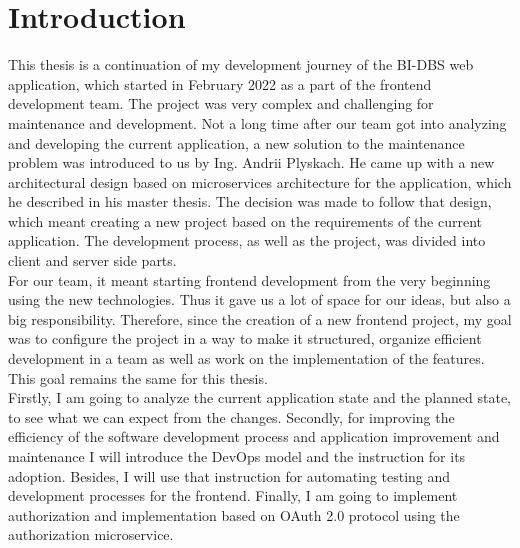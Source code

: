 \chapter{Introduction}

This thesis is a continuation of my development journey of the BI-DBS web application, which started in February 2022 as a part of the frontend development team. The project was very complex and challenging for maintenance and development. Not a long time after our team got into analyzing and developing the current application, a new solution to the maintenance problem was introduced to us by Ing. Andrii Plyskach. He came up with a new architectural design based on microservices architecture for the application, which he described in his master thesis\cite{mt-plyskach}. The decision was made to follow that design, which meant creating a new project based on the requirements of the current application. The development process, as well as the project, was divided into client and server side parts.\\
For our team, it meant starting frontend development from the very beginning using the new technologies. Thus it gave us a lot of space for our ideas, but also a big responsibility. Therefore, since the creation of a new frontend project, my goal was to configure the project in a way to make it structured, organize efficient development in a team as well as work on the implementation of the features. This goal remains the same for this thesis.\\
Firstly, I am going to analyze the current application state and the planned state, to see what we can expect from the changes. Secondly, for improving the efficiency of the software development process and application improvement and maintenance I will introduce the DevOps model and the instruction for its adoption. Besides, I will use that instruction for automating testing and development processes for the frontend. Finally, I am going to implement authorization and implementation based on OAuth 2.0 protocol using the authorization microservice.
